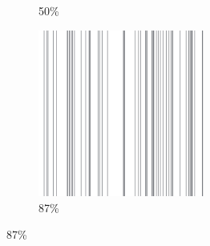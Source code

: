 \documentclass[12pt, fleqn]{report}                             %
\theoremstyle{break}                                            %
\begin{document}
\begin{figure}[ht!]
\begin{subfigure}[b]{0.4\linewidth}
          \caption{50\%}
        \end{subfigure}
        \begin{subfigure}[b]{0.4\linewidth}
          \includegraphics[width=0.6\textwidth]{Images/204/d.png}
          \caption{87\%}
        \end{subfigure}
      \end{figure}
\end{document}
